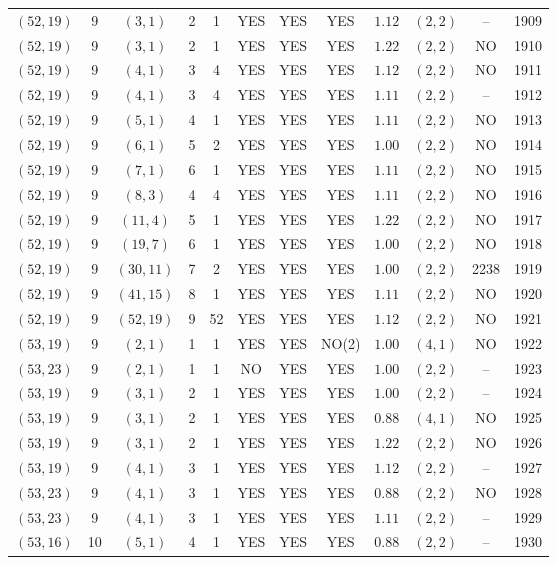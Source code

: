 \begin{longtable}{|c|c|c|c|c|c|c|c|c|c|c|c|}
$(52,19)$ & 9 & $(3,1)$ & 2 & 1 & YES & YES & YES & $1.12$ & $(2,2)$ & -- & 1909\\
$(52,19)$ & 9 & $(3,1)$ & 2 & 1 & YES & YES & YES & $1.22$ & $(2,2)$ & NO & 1910\\
$(52,19)$ & 9 & $(4,1)$ & 3 & 4 & YES & YES & YES & $1.12$ & $(2,2)$ & NO & 1911\\
$(52,19)$ & 9 & $(4,1)$ & 3 & 4 & YES & YES & YES & $1.11$ & $(2,2)$ & -- & 1912\\
$(52,19)$ & 9 & $(5,1)$ & 4 & 1 & YES & YES & YES & $1.11$ & $(2,2)$ & NO & 1913\\
$(52,19)$ & 9 & $(6,1)$ & 5 & 2 & YES & YES & YES & $1.00$ & $(2,2)$ & NO & 1914\\
$(52,19)$ & 9 & $(7,1)$ & 6 & 1 & YES & YES & YES & $1.11$ & $(2,2)$ & NO & 1915\\
$(52,19)$ & 9 & $(8,3)$ & 4 & 4 & YES & YES & YES & $1.11$ & $(2,2)$ & NO & 1916\\
$(52,19)$ & 9 & $(11,4)$ & 5 & 1 & YES & YES & YES & $1.22$ & $(2,2)$ & NO & 1917\\
$(52,19)$ & 9 & $(19,7)$ & 6 & 1 & YES & YES & YES & $1.00$ & $(2,2)$ & NO & 1918\\
$(52,19)$ & 9 & $(30,11)$ & 7 & 2 & YES & YES & YES & $1.00$ & $(2,2)$ & 2238 & 1919\\
$(52,19)$ & 9 & $(41,15)$ & 8 & 1 & YES & YES & YES & $1.11$ & $(2,2)$ & NO & 1920\\
$(52,19)$ & 9 & $(52,19)$ & 9 & 52 & YES & YES & YES & $1.12$ & $(2,2)$ & NO & 1921\\
$(53,19)$ & 9 & $(2,1)$ & 1 & 1 & YES & YES & NO(2) & $1.00$ & $(4,1)$ & NO & 1922\\
$(53,23)$ & 9 & $(2,1)$ & 1 & 1 & NO & YES & YES & $1.00$ & $(2,2)$ & -- & 1923\\
$(53,19)$ & 9 & $(3,1)$ & 2 & 1 & YES & YES & YES & $1.00$ & $(2,2)$ & -- & 1924\\
$(53,19)$ & 9 & $(3,1)$ & 2 & 1 & YES & YES & YES & $0.88$ & $(4,1)$ & NO & 1925\\
$(53,19)$ & 9 & $(3,1)$ & 2 & 1 & YES & YES & YES & $1.22$ & $(2,2)$ & NO & 1926\\
$(53,19)$ & 9 & $(4,1)$ & 3 & 1 & YES & YES & YES & $1.12$ & $(2,2)$ & -- & 1927\\
$(53,23)$ & 9 & $(4,1)$ & 3 & 1 & YES & YES & YES & $0.88$ & $(2,2)$ & NO & 1928\\
$(53,23)$ & 9 & $(4,1)$ & 3 & 1 & YES & YES & YES & $1.11$ & $(2,2)$ & -- & 1929\\
$(53,16)$ & 10 & $(5,1)$ & 4 & 1 & YES & YES & YES & $0.88$ & $(2,2)$ & -- & 1930\\

\end{longtable}
